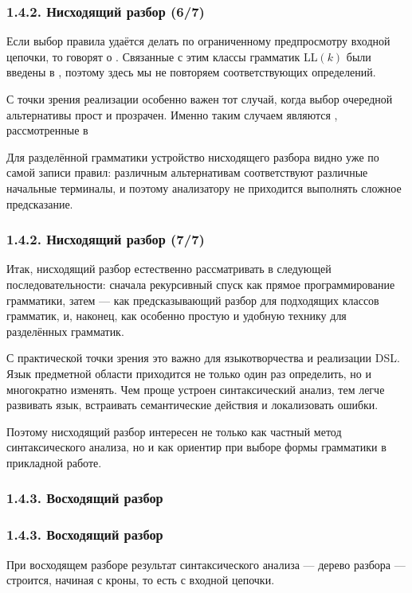 \begin{frame}
\frametitle{1.4.2. Нисходящий разбор (6/7)}

Если выбор правила удаётся делать по ограниченному предпросмотру входной цепочки,
то говорят о . Связанные
с этим классы грамматик LL$(k)$ были введены в , поэтому здесь
мы не повторяем соответствующих определений.

С точки зрения реализации особенно важен тот случай, когда выбор очередной
альтернативы прост и прозрачен. Именно таким случаем являются
, рассмотренные в

Для разделённой грамматики устройство нисходящего разбора видно уже по самой записи
правил: различным альтернативам соответствуют различные начальные терминалы, и
поэтому анализатору не приходится выполнять сложное предсказание.

\end{frame}

\begin{frame}
\frametitle{1.4.2. Нисходящий разбор (7/7)}

Итак, нисходящий разбор естественно рассматривать в следующей последовательности:
сначала рекурсивный спуск как прямое программирование грамматики, затем --- как
предсказывающий разбор для подходящих классов грамматик, и, наконец, как особенно
простую и удобную технику для разделённых грамматик.

\begin{digress}
С практической точки зрения это важно для языкотворчества и реализации DSL.
Язык предметной области приходится не только один раз определить, но и многократно
изменять. Чем проще устроен синтаксический анализ, тем легче развивать язык,
встраивать семантические действия и локализовать ошибки.
\end{digress}

Поэтому нисходящий разбор интересен не только как частный метод синтаксического
анализа, но и как ориентир при выборе формы грамматики в прикладной работе.

\end{frame}

\subsubsection{1.4.3. Восходящий разбор}
\label{1.4.3.}
\begin{frame}
\frametitle{1.4.3. Восходящий разбор}

При восходящем разборе результат синтаксического анализа 
--- дерево разбора --- строится, начиная с кроны, то есть с входной цепочки.

\medskip
{}
\end{frame}


